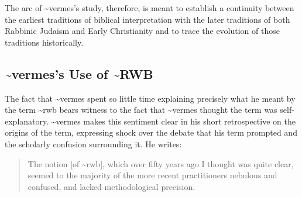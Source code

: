 The arc of \textasciitilde{}vermes's study, therefore, is meant to
establish a continuity between the earliest traditions of biblical
interpretation with the later traditions of both Rabbinic Judaism and
Early Christianity and to trace the evolution of those traditions
historically.

\hypertarget{vermess-use-of-rwb}{%
\subsection{\textasciitilde{}vermes's Use of
\textasciitilde{}RWB}\label{vermess-use-of-rwb}}

The fact that \textasciitilde{}vermes spent so little time explaining
precisely what he meant by the term \textasciitilde{}rwb bears witness
to the fact that \textasciitilde{}vermes thought the term was
self-explanatory. \textasciitilde{}vermes makes this sentiment clear in
his short retrospective on the origins of the term, expressing shock
over the debate that his term prompted and the scholarly confusion
surrounding it. He writes:

\begin{quote}
The notion {[}of \textasciitilde{}rwb{]}, which over fifty years ago I
thought was quite clear, seemed to the majority of the more recent
practitioners nebulous and confused, and lacked methodological
precision.\autocite[3]{vermes_zsengeller2014}
\end{quote}


